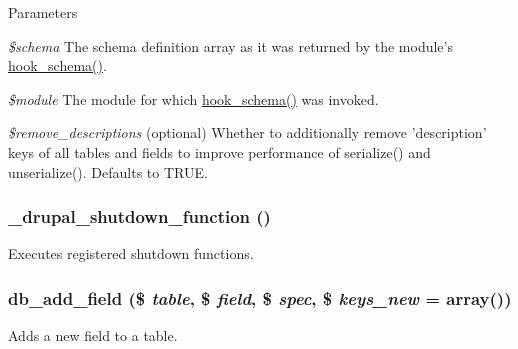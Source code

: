 \begin{DoxyParams}{Parameters}
\item[{\em \$schema}]The schema definition array as it was returned by the module's \hyperlink{group__schemaapi_ga9abd926ddaf68a22e6dca28a25d0c6f5}{hook\_\-schema()}. \item[{\em \$module}]The module for which \hyperlink{group__schemaapi_ga9abd926ddaf68a22e6dca28a25d0c6f5}{hook\_\-schema()} was invoked. \item[{\em \$remove\_\-descriptions}](optional) Whether to additionally remove 'description' keys of all tables and fields to improve performance of serialize() and unserialize(). Defaults to TRUE. \end{DoxyParams}
\hypertarget{group__schemaapi_ga8da38564ce2a3c92aa5103da6ae2a315}{
\subsubsection[{\_\-drupal\_\-shutdown\_\-function}]{\setlength{\rightskip}{0pt plus 5cm}\_\-drupal\_\-shutdown\_\-function ()}}
\label{group__schemaapi_ga8da38564ce2a3c92aa5103da6ae2a315}
Executes registered shutdown functions. \hypertarget{group__schemaapi_ga10bc9c435dd6d36c112d7ec179840cff}{
\subsubsection[{db\_\-add\_\-field}]{\setlength{\rightskip}{0pt plus 5cm}db\_\-add\_\-field (\$ {\em table}, \/  \$ {\em field}, \/  \$ {\em spec}, \/  \$ {\em keys\_\-new} = {\ttfamily array()})}}
\label{group__schemaapi_ga10bc9c435dd6d36c112d7ec179840cff}
Adds a new field to a table.


